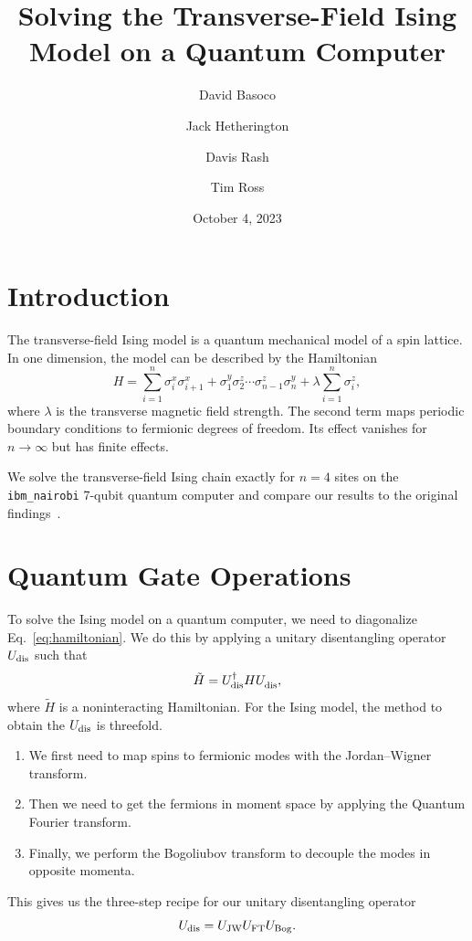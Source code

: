 \documentclass[12pt]{article}
\title{Solving the Transverse-Field Ising Model on a Quantum Computer}
\author{David Basoco \and Jack Hetherington \and Davis Rash \and Tim Ross}
\date{October 4, 2023}
\begin{document}
  \maketitle


  \section{Introduction}

  The transverse-field Ising model is a quantum mechanical model of a spin lattice. In one dimension, the model can be described by the Hamiltonian
  \begin{equation}
    \label{eq:hamiltonian}
    H = \sum_{i = 1}^{n} \sigma_{i}^{x} \sigma_{i + 1}^{x}
        + \sigma_{1}^{y} \sigma_{2}^{z} \dotsm \sigma_{n - 1}^{z} \sigma_{n}^{y}
        + \lambda \sum_{i = 1}^{n} \sigma_{i}^{z},
  \end{equation}
  where \( \lambda \) is the transverse magnetic field strength. The second term maps periodic boundary conditions to fermionic degrees of freedom. Its effect vanishes for \( n \to \infty \) but has finite effects.

  We solve the transverse-field Ising chain exactly for \( n = 4 \) sites on the \texttt{ibm\_nairobi} 7-qubit quantum computer and compare our results to the original findings~\cite{CerveraLierta18}.


  \section{Quantum Gate Operations}

  To solve the Ising model on a quantum computer, we need to diagonalize Eq.~\eqref{eq:hamiltonian}. We do this by applying a unitary disentangling operator \( U_{\textnormal{dis}} \) such that
  \begin{equation}
    \tilde{H}
      = U_{\textnormal{dis}}^{\dagger} H
        U_{\textnormal{dis}}^{\vphantom{\dagger}},
  \end{equation}
  where \( \tilde{H} \) is a noninteracting Hamiltonian. For the Ising model, the method to obtain the \( U_{\textnormal{dis}} \) is threefold.
  \begin{enumerate}
   \item We first need to map spins to fermionic modes with the Jordan--Wigner transform.
   \item Then we need to get the fermions in moment space by applying the Quantum Fourier transform.
   \item Finally, we perform the Bogoliubov transform to decouple the modes in opposite momenta.
  \end{enumerate}
  This gives us the three-step recipe for our unitary disentangling operator
  \begin{equation}
    U_{\textnormal{dis}}
      = U_{\textnormal{JW}} U_{\textnormal{FT}} U_{\textnormal{Bog}}.
  \end{equation}
\end{document}
